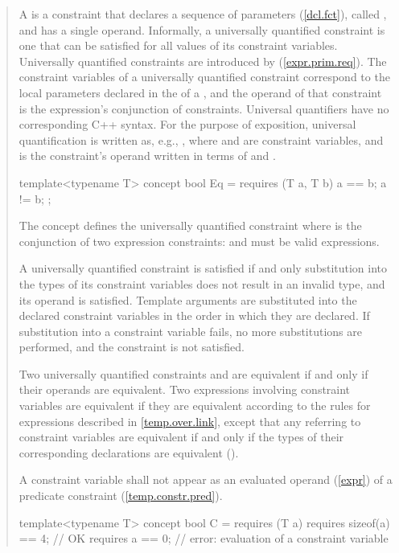 \begin{quote}
\pnum
A  is a constraint that declares a sequence
of parameters (\ref{dcl.fct}), called , and has a 
single operand. 
% 
Informally, a universally quantified constraint is one that can be satisfied
for all values of its constraint variables.
% 
\enternote
Universally quantified constraints are introduced by
 (\ref{expr.prim.req}). The constraint 
variables of a universally quantified constraint correspond to the local 
parameters declared in the  of a
, and the operand of that constraint
is the expression's conjunction of constraints.
\exitnote
% 
\enternote 
Universal quantifiers have no corresponding C++ syntax. For the purpose of 
exposition, universal quantification is written as, e.g.,
, where  and  are
constraint variables, and  is the constraint's operand
written in terms of  and .
\exitnote
% 
\enterexample
\begin{codeblock}
template<typename T>
  concept bool Eq = requires (T a, T b) {
    a == b;
    a != b;
  };
\end{codeblock}
The concept  defines the universally quantified constraint
 where  is the conjunction
of two expression constraints:  and  must be
valid expressions.
\exitexample

\pnum
A universally quantified constraint is satisfied if and only substitution into 
the types of its constraint variables does not result in an invalid type, and its
operand is satisfied. Template arguments are substituted into the declared
constraint variables in the order in which they are declared. If substitution 
into a constraint variable fails, no more substitutions are performed, and
the constraint is not satisfied.

\pnum
Two universally quantified constraints  and  are equivalent 
if and only if their operands are equivalent.
% 
Two expressions involving constraint variables are equivalent if they
are equivalent according to the rules for expressions described in 
\ref{temp.over.link}, except that any  referring to 
constraint variables are equivalent if and only if the types of their 
corresponding declarations are equivalent ().

\pnum
A constraint variable shall not appear as an evaluated operand 
(\ref{expr}) of a predicate constraint (\ref{temp.constr.pred}).
\enterexample
\begin{codeblock}
template<typename T> 
  concept bool C = requires (T a) {
    requires sizeof(a) == 4; // OK
    requires a == 0;         // error: evaluation of a constraint variable
  }
\end{codeblock}
\exitexample



\end{quote}
